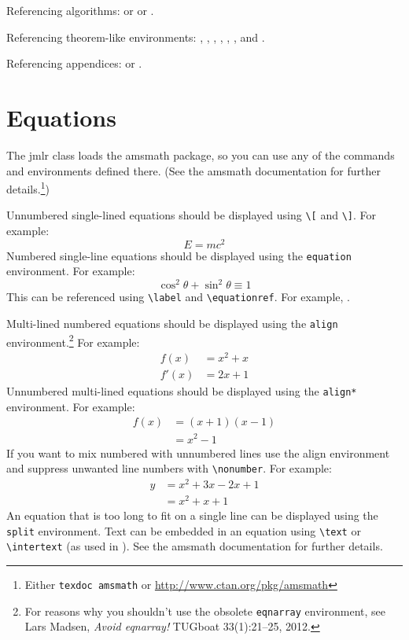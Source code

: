 \documentclass[mlmain]{jmlr}
\begin{document}
Referencing algorithms:  or
 or
.

Referencing theorem-like environments: ,
, , 
, ,
,  and
.

Referencing appendices:  or
.

\section{Equations}
\label{sec:math}

The \textsf{jmlr} class loads the \textsf{amsmath} package, so
you can use any of the commands and environments defined there.
(See the \textsf{amsmath} documentation for further
details.\footnote{Either \texttt{texdoc amsmath} or
\url{http://www.ctan.org/pkg/amsmath}})

Unnumbered single-lined equations should be displayed using
\verb|\[| and \verb|\]|. For example:
\[E = m c^2\]
Numbered single-line equations should be displayed using the
\texttt{equation} environment. For example:
\begin{equation}\label{eq:trigrule}
\cos^2\theta + \sin^2\theta \equiv 1
\end{equation}
This can be referenced using \verb|\label| and \verb|\equationref|.
For example, .

Multi-lined numbered equations should be displayed using the
\texttt{align} environment.\footnote{For reasons why you 
shouldn't use the obsolete \texttt{eqnarray} environment, see
Lars Madsen, \emph{Avoid eqnarray!} TUGboat 33(1):21--25, 2012.} For example:
\begin{align}
f(x) &= x^2 + x\label{eq:f}\\
f'(x) &= 2x + 1\label{eq:df}
\end{align}
Unnumbered multi-lined equations should be displayed using the
\texttt{align*} environment. For example:
\begin{align*}
f(x) &= (x+1)(x-1)\\
&= x^2 - 1
\end{align*}
If you want to mix numbered with unnumbered lines use the
align environment and suppress unwanted line numbers with
\verb|\nonumber|. For example:
\begin{align}
y &= x^2 + 3x - 2x + 1\nonumber\\
&= x^2 + x + 1\label{eq:y}
\end{align}
An equation that is too long to fit on a single line can be
displayed using the \texttt{split} environment. 
Text can be embedded in an equation using \verb|\text| or
\verb|\intertext| (as used in ).
See the \textsf{amsmath} documentation for further details.
\end{document}
